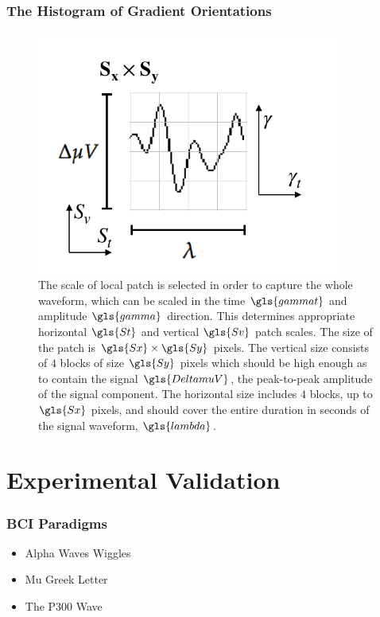 \documentclass[aspectratio=169]{beamer}
\begin{document}
\begin{frame}
\frametitle{The Histogram of Gradient Orientations}
\begin{center}
\begin{figure}[h!]
\centering
\includegraphics[width=10cm]{images/patchgeometry.pdf}
\caption[Patch Geometry]{The scale of local patch is selected in order to capture the whole waveform, which can be scaled in the time $\gls{gammat}$ and amplitude $\gls{gamma}$ direction.  This determines appropriate horizontal $\gls{St}$ and vertical $\gls{Sv}$ patch scales.  The size of the patch is $\gls{Sx} \times \gls{Sy}$ pixels. The vertical size consists of $4$ blocks of size $\gls{Sy}$ pixels which should be high enough as to contain the signal $\gls{DeltamuV}$, the peak-to-peak amplitude of the signal component. The horizontal size includes $4$ blocks, up to $\gls{Sx}$ pixels, and should cover the entire duration in seconds of the signal waveform, $\gls{lambda}$.   }
\label{fig:patchgeometry}
\end{figure}
\end{center}
\end{frame}

   

\section{Experimental Validation}
\begin{frame}
\frametitle{BCI Paradigms}
\begin{center}
\begin{itemize}
 \item<1-> Alpha Waves Wiggles
 \item<2-> Mu Greek Letter
 \item<3-> The P300 Wave
\end{itemize}
\end{center}
\end{frame}     
\end{document}
